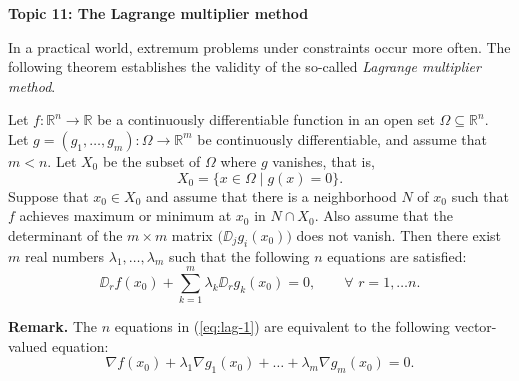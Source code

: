 \documentclass[11pt]{article}
\begin{document}
\begin{center}
  \textbf{Topic 11: The Lagrange multiplier method} 
\end{center}

In a practical world, extremum problems under constraints occur more
often.  The following theorem establishes the validity of the
so-called \textit{Lagrange multiplier method}.

\begin{thm}
  \label{thm:lagrange}
  Let $f: \mathbb{R}^n \rightarrow \mathbb{R}$ be a continuously differentiable
  function in an open set $\Omega \subseteq \mathbb{R}^n$.  Let $g = (g_1,
  \dots, g_m) : \Omega \rightarrow \mathbb{R}^m$ be continuously differentiable,
  and assume that $m < n$.  Let $X_0$ be the subset of $\Omega$ where $g$
  vanishes, that is,
  \begin{equation*}
    X_0 = \{ x \in \Omega \mid g(x) = 0 \}.
  \end{equation*}
  Suppose that $x_0 \in X_0$ and assume that there is a neighborhood
  $N$ of $x_0$ such that $f$ achieves maximum or minimum at $x_0$ in
  $N \cap X_0$.  Also assume that the determinant of the $m \times m$
  matrix $\bigl( \DD_j g_i(x_0) \bigr)$ does not vanish.  Then there
  exist $m$ real numbers $\lambda_1, \dots, \lambda_m$ such that the
  following $n$ equations are satisfied:
  \begin{equation}
    \label{eq:lag-1}
    \DD_r f(x_0) + \sum_{k=1}^m \lambda_k \DD_r g_k(x_0) = 0, \qquad
    \forall \,\, r = 1, \dots n.
  \end{equation}
\end{thm}

\noindent\textbf{Remark.} The $n$ equations in (\ref{eq:lag-1}) are equivalent to the
following vector-valued equation:
\begin{equation}
  \label{eq:lag-2}
  \nabla f(x_0) + \lambda_1 \nabla g_1(x_0) + \dots + \lambda_m \nabla
  g_m(x_0) = 0.
\end{equation}
\end{document}
